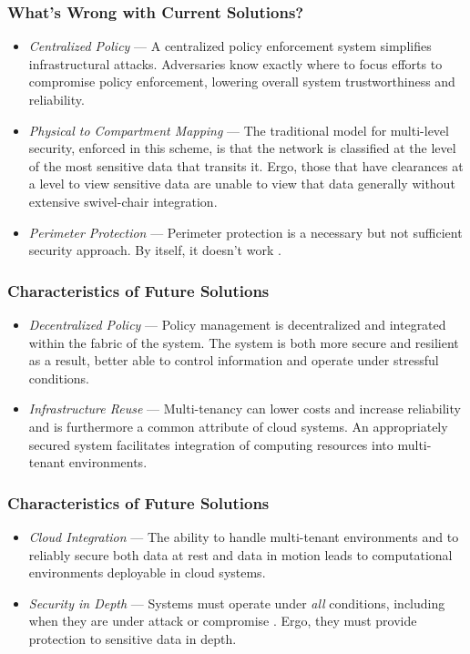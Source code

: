 \begin{frame}
\frametitle{What's Wrong with Current Solutions?}
\begin{itemize}
\item<2-> \textit{Centralized Policy} --- A centralized policy enforcement system simplifies infrastructural attacks.  Adversaries know exactly where to focus efforts to compromise policy enforcement, lowering overall system trustworthiness and reliability. 
\item<3-> \textit{Physical to Compartment Mapping} --- The traditional model for multi-level security, enforced in this scheme, is that the network is classified at the level of the most sensitive data that transits it.  Ergo, those that have clearances at a level to view sensitive data are unable to view that data generally without extensive swivel-chair integration.
\item<4-> \textit{Perimeter Protection} --- Perimeter protection is a necessary but not sufficient security approach.  By itself, it doesn't work \cite{proposal:ron-ross}.
\end{itemize}
\end{frame}

\begin{frame}
\frametitle{Characteristics of Future Solutions}
\begin{itemize}
\item<2-> \textit{Decentralized Policy} --- Policy management is decentralized and integrated within the fabric of the system.  The system is both more secure and resilient as a result, better able to control information and operate under stressful conditions.
\item<3-> \textit{Infrastructure Reuse} --- Multi-tenancy can lower costs and increase reliability and is furthermore a common attribute of cloud systems.  An appropriately secured system facilitates integration of computing resources into multi-tenant environments.
\end{itemize}
\end{frame}

\begin{frame}
\frametitle{Characteristics of Future Solutions}
\begin{itemize}
\item<2-> \textit{Cloud Integration} --- The ability to handle multi-tenant environments and to reliably secure both data at rest and data in motion leads to computational environments deployable in cloud systems.
\item<3-> \textit{Security in Depth} --- Systems must operate under \textit{all} conditions, including when they are under attack or compromise \cite{proposal:ron-ross}.  Ergo, they must provide protection to sensitive data in depth.
\end{itemize}
\end{frame}
